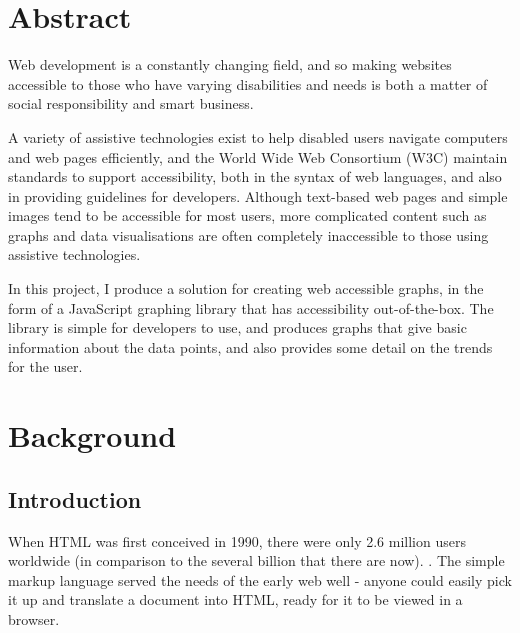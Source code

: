 \documentclass[ %
                    author={Aleena Baig},
                supervisor={Dr Simon Lock},
                    degree={BSc},
                     title={On Making Web Accessible Graphs},
                  subtitle={},
                      year={2019} ]{dissertation}
\begin{document}
\frontmatter


\makedecl

\tableofcontents


\setlength{\parskip}{1em}

\chapter{Abstract}

Web development is a constantly changing field, and so making websites accessible to those who have varying disabilities and needs is both a matter of social responsibility and smart business.

A variety of assistive technologies exist to help disabled users navigate computers and web pages efficiently, and the World Wide Web Consortium (W3C) maintain standards to support accessibility, both in the syntax of web languages, and also in providing guidelines for developers. Although text-based web pages and simple images tend to be accessible for most users, more complicated content such as graphs and data visualisations are often completely inaccessible to those using assistive technologies.

In this project, I produce a solution for creating web accessible graphs, in the form of a JavaScript graphing library that has accessibility out-of-the-box. The library is simple for developers to use, and produces graphs that give basic information about the data points, and also provides some detail on the trends for the user.


\mainmatter

\chapter{Background}

\section{Introduction}
When HTML was first conceived in 1990, there were only 2.6 million users worldwide (in comparison to the several billion that there are now). \cite{ourworldindata:internet}. The simple markup language served the needs of the early web well - anyone could easily pick it up and translate a document into HTML, ready for it to be viewed in a browser.
\end{document}
